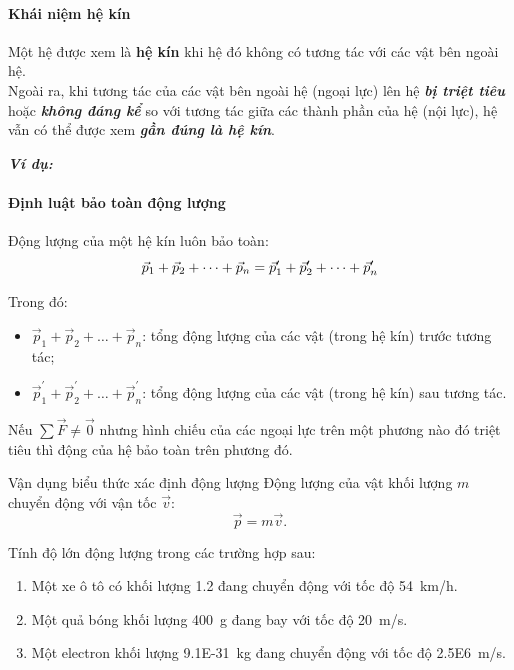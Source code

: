 \begin{tomtat}
	\paragraph{Khái niệm hệ kín}
	\begin{dn}
		Một hệ được xem là \textbf{hệ kín} khi hệ đó không có tương tác với các vật bên ngoài hệ.\\
		Ngoài ra, khi tương tác của các vật bên ngoài hệ (ngoại lực) lên hệ \textbf{\textit{bị triệt tiêu}} hoặc \textbf{\textit{không đáng kể}} so với tương tác giữa các thành phần của hệ (nội lực), hệ vẫn có thể được xem \textbf{\textit{gần đúng là hệ kín}}.
	\end{dn}
	\textbf{\textit{Ví dụ:}}
	\paragraph{Định luật bảo toàn động lượng}
	\begin{dl}
		Động lượng của một hệ kín luôn bảo toàn:
		\begin{equation}
			\vec{p}_1+\vec{p}_2+\dots+\vec{p}_n=\vec{p}^\prime_1+\vec{p}^\prime_2+\dots+\vec{p}^\prime_n\\
			\label{eq:2}
		\end{equation}
	\end{dl}
	Trong đó:
	\begin{itemize}
		\item $\vec{p}_1+\vec{p}_2+\dots+\vec{p}_n$: tổng động lượng của các vật (trong hệ kín) trước tương tác;
		\item $\vec{p}^\prime_1+\vec{p}^\prime_2+\dots+\vec{p}^\prime_n$: tổng động lượng của các vật (trong hệ kín) sau tương tác.
	\end{itemize}
\end{tomtat}
\begin{note}
	Nếu $\sum\vec{F}\neq \vec{0}$ nhưng hình chiếu của các ngoại lực trên một phương nào đó triệt tiêu thì động của hệ bảo toàn trên phương đó.
\end{note}
\begin{dang}{Vận dụng biểu thức xác định động lượng}
	Động lượng của vật khối lượng $m$ chuyển động với vận tốc $\vec{v}$:
	$$\vec{p}=m\vec{v}.$$
\end{dang}
\begin{vd}
	Tính độ lớn động lượng trong các trường hợp sau:
	\begin{enumerate}[label=\alph*)]
		\item Một xe ô tô có khối lượng \SI{1.2}{} đang chuyển động với tốc độ \SI{54}{\kilo\meter/\hour}.
		\item Một quả bóng khối lượng \SI{400}{\gram} đang bay với tốc độ \SI{20}{\meter/\second}.
		\item Một electron khối lượng \SI{9.1E-31}{\kilogram} đang chuyển động với tốc độ \SI{2.5E6}{\meter/\second}.
	\end{enumerate}
\end{vd}
